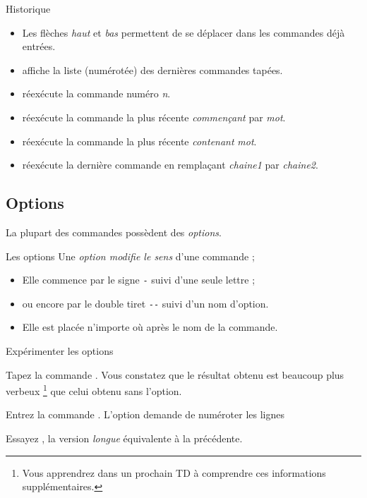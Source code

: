 \documentclass[a4paper,11pt]{style-esi/td}
\begin{document}
		\begin{theorie}{Historique}
			\begin{itemize}
			\item 
				Les flèches \emph{haut} et \emph{bas}
				permettent de se déplacer dans les commandes déjà entrées.
			\item 
				 affiche la liste (numérotée)
				des dernières commandes tapées.
			\item 
				 réexécute la commande numéro \emph{n}.
			\item 
				 réexécute la commande la plus récente 
				\emph{commençant} par \emph{mot}.
			\item 
				 réexécute la commande la plus récente 
				\emph{contenant} \emph{mot}.
			\item 
				 réexécute la dernière commande
				en remplaçant \emph{chaine1} par \emph{chaine2}.
			\end{itemize}
		\end{theorie}

	\subsection{Options}
	
		La plupart des commandes possèdent des \emph{options}.

		\begin{theorie}{Les options}
			Une \emph{option modifie le sens} d'une commande ;
			\begin{itemize}
			\item Elle commence par le signe \texttt{-} suivi d'une seule lettre ;
			\item ou encore par le double tiret \texttt{-{}-} suivi d'un nom d'option.
			\item Elle est placée n'importe où après le nom de la commande.   
			\end{itemize}
		\end{theorie}		

		\begin{Experience}{Expérimenter les options}		
			\vspace{-1em}
			\begin{steps}
			\item Tapez la commande . 
				Vous constatez que le résultat obtenu est beaucoup plus verbeux%
				\footnote{%
					Vous apprendrez dans un prochain TD 
					à comprendre ces informations supplémentaires.
				} 
				que celui obtenu sans l'option.
			\item Entrez la commande . 
				L'option demande de numéroter les lignes 
			\item Essayez ,
				la version \textit{longue} équivalente à la précédente.
			\end{steps}
		\end{Experience}
\end{document}
